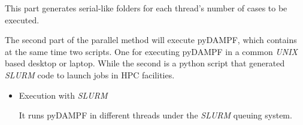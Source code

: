 \documentclass[letterpaper,compsoc,twoside]{IEEEtran}
\begin{document}
\vspace{1mm}

This part generates serial-like folders for each thread's number of cases to be executed.

The second part of the parallel method will execute pyDAMPF, which contains at the same time two scripts. One for executing pyDAMPF in a common \textit{UNIX} based desktop or laptop. While the second is a python script that generated \textit{SLURM} code to launch jobs in HPC facilities.

\begin{itemize}
\item 
Execution with \textit{SLURM}

It runs pyDAMPF in different threads under the \textit{SLURM} queuing system.

\begin{Verbatim}[commandchars=\\\{\},fontsize=\footnotesize]


\end{Verbatim}
\end{itemize}
\end{document}
